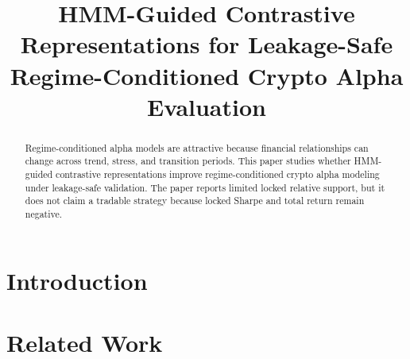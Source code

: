 \documentclass[sigconf,anonymous,review]{acmart}
\title{HMM-Guided Contrastive Representations for Leakage-Safe Regime-Conditioned Crypto Alpha Evaluation}
\begin{document}
\begin{abstract}
Regime-conditioned alpha models are attractive because financial relationships can change across trend, stress, and transition periods. This paper studies whether HMM-guided contrastive representations improve regime-conditioned crypto alpha modeling under leakage-safe validation. The paper reports limited locked relative support, but it does not claim a tradable strategy because locked Sharpe and total return remain negative.
\end{abstract}


\maketitle


\section{Introduction}

\section{Related Work}
\end{document}
